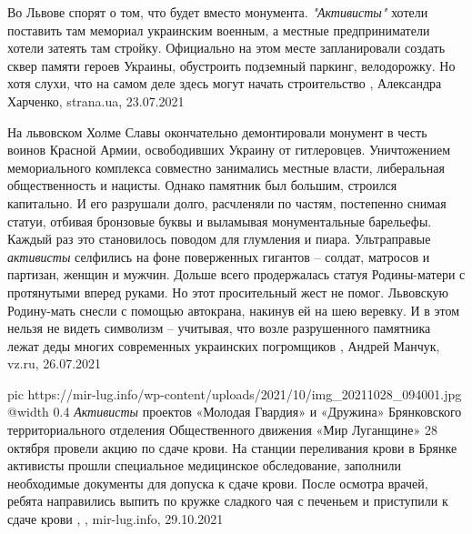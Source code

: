 Во Львове спорят о том, что будет вместо монумента. \emph{"Активисты"} хотели
поставить там мемориал украинским военным, а местные предприниматели хотели
затеять там стройку.  Официально на этом месте запланировали создать сквер
памяти героев Украины, обустроить подземный паркинг, велодорожку. Но хотя
слухи, что на самом деле здесь могут начать строительство
, 
Александра Харченко, strana.ua, 23.07.2021


На львовском Холме Славы окончательно демонтировали монумент в честь воинов
Красной Армии, освободивших Украину от гитлеровцев. Уничтожением мемориального
комплекса совместно занимались местные власти, либеральная общественность и
нацисты. Однако памятник был большим, строился капитально. И его разрушали
долго, расчленяли по частям, постепенно снимая статуи, отбивая бронзовые буквы
и выламывая монументальные барельефы.  Каждый раз это становилось поводом для
глумления и пиара. Ультраправые \emph{активисты} селфились на фоне поверженных
гигантов – солдат, матросов и партизан, женщин и мужчин. Дольше всего
продержалась статуя Родины-матери с протянутыми вперед руками. Но этот
просительный жест не помог. Львовскую Родину-мать снесли с помощью автокрана,
накинув ей на шею веревку. И в этом нельзя не видеть символизм – учитывая, что
возле разрушенного памятника лежат деды многих современных украинских
погромщиков
, 
Андрей Манчук, vz.ru, 26.07.2021

\ifcmt
  pic https://mir-lug.info/wp-content/uploads/2021/10/img_20211028_094001.jpg
  @width 0.4
\fi
\emph{Активисты} проектов «Молодая Гвардия» и «Дружина» Брянковского
территориального отделения Общественного движения «Мир Луганщине» 28 октября
провели акцию по сдаче крови.  На станции переливания крови в Брянке активисты
прошли специальное медицинское обследование, заполнили необходимые документы
для допуска к сдаче крови. После осмотра врачей, ребята направились выпить по
кружке сладкого чая с печеньем и приступили к сдаче крови
, , mir-lug.info, 29.10.2021

